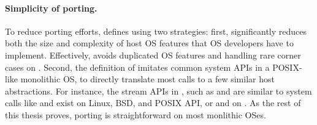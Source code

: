 \paragraph{Simplicity of porting.}
To reduce porting efforts,
\graphene{} defines \thehostabi{}
using two strategies:
first, \graphene{} significantly reduces both the size and complexity of host OS features
that OS developers have to implement.
Effectively, \graphene{} avoids duplicated OS features and handling rare corner cases
on \thehostabi{}.
Second, the definition of \thehostabi{}
imitates common system APIs in a POSIX-like monolithic OS,
to directly translate most calls to
a few similar host abstractions.
For instance,
the stream APIs in \thehostabi{}, such as  and 
are similar to
system calls like  and  exist on Linux, BSD, and POSIX API,
or  and 
on \win{}.
As the rest of this thesis proves, porting \thehostabi{} is straightforward
on most monlithic OSes.

